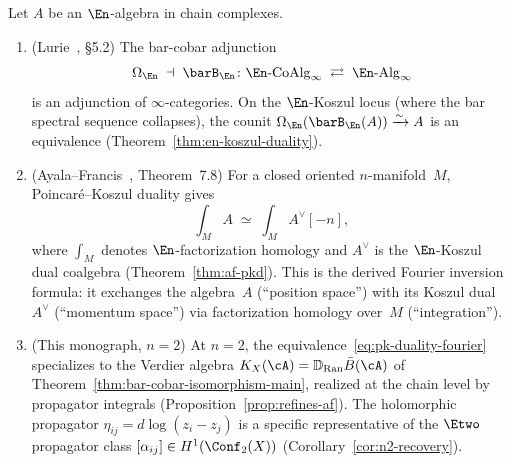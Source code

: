 \begin{theorem}
\label{thm:derived-fourier}
Let $A$ be an $\En$-algebra in chain complexes.
\begin{enumerate}[label=\textup{(\roman*)}]
\item \textup{(Lurie~\cite{HA}, \S5.2)}\quad
 The bar-cobar adjunction
 \[
 \Omega_{\En} \;\dashv\; \barB_{\En}
 \colon
 \En\text{-}\mathrm{CoAlg}_\infty
 \;\rightleftarrows\;
 \En\text{-}\mathrm{Alg}_\infty
 \]
 is an adjunction of\/ $\infty$-categories. On the
 $\En$-Koszul locus (where the bar spectral sequence
 collapses), the counit
 $\Omega_{\En}(\barB_{\En}(A)) \xrightarrow{\sim} A$
 is an equivalence
 \textup{(}Theorem~\textup{\ref{thm:en-koszul-duality})}.

\item \textup{(Ayala--Francis~\cite{AF15}, Theorem~7.8)}\quad
 For a closed oriented $n$-manifold~$M$,
 Poincar\'e--Koszul duality gives
 \begin{equation}\label{eq:pk-duality-fourier}
 \int_M A
 \;\simeq\;
 \int_M A^{\vee}[-n],
 \end{equation}
 where $\int_M$ denotes $\En$-factorization homology and
 $A^\vee$ is the $\En$-Koszul dual coalgebra
 \textup{(}Theorem~\textup{\ref{thm:af-pkd})}. This is the
 derived Fourier inversion formula: it exchanges the algebra~$A$
 (``position space'') with its Koszul dual~$A^\vee$ (``momentum
 space'') via factorization homology over~$M$ (``integration'').

\item \textup{(This monograph, $n = 2$)}\quad
 At $n = 2$, the equivalence~\eqref{eq:pk-duality-fourier}
 specializes to the Verdier algebra
 $K_X(\cA)=\mathbb{D}_{\mathrm{Ran}}\bar{B}(\cA)$
 of Theorem~\textup{\ref{thm:bar-cobar-isomorphism-main}},
 realized at the chain level by propagator integrals
 \textup{(}Proposition~\textup{\ref{prop:refines-af})}.
 The holomorphic propagator $\eta_{ij} = d\log(z_i - z_j)$
 is a specific representative of the $\Etwo$ propagator class
 $[\alpha_{ij}] \in H^1(\Conf_2(X))$
 \textup{(}Corollary~\textup{\ref{cor:n2-recovery})}.
\end{enumerate}
\end{theorem}

